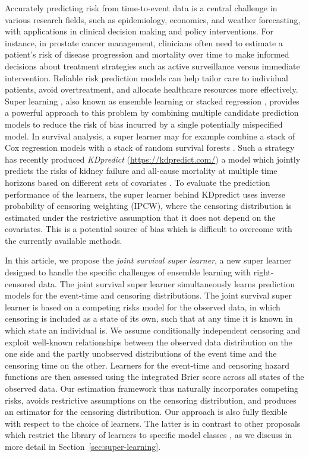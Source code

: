 \documentclass[alpha-refs]{wiley-article}
\newcommand{\1}{\mathds{1}}
\begin{document}
Accurately predicting risk from time-to-event data is a central
challenge in various research fields, such as epidemiology, economics,
and weather forecasting, with applications in clinical decision making
and policy interventions. For instance, in prostate cancer management,
clinicians often need to estimate a patient’s risk of disease
progression and mortality over time to make informed decisions about
treatment strategies such as active surveillance versus immediate
intervention. Reliable risk prediction models can help tailor care to
individual patients, avoid overtreatment, and allocate healthcare
resources more effectively. Super learning \citep{van2007super}, also
known as ensemble learning or stacked regression
\citep{wolpert1992stacked,breiman1996stacked}, provides a powerful
approach to this problem by combining multiple candidate prediction
models to reduce the risk of bias incurred by a single potentially
mispecified model. In survival analysis, a super learner may for example combine a
stack of Cox regression models with a stack of random survival forests
\citep[][Section 8.4]{gerds2021medical}. Such a strategy has recently
produced \textit{KDpredict} (\url{https://kdpredict.com/}) a model which
jointly predicts the risks of kidney failure and all-cause mortality
at multiple time horizons based on different sets of covariates
\citep{liu2024predicting}. To evaluate the prediction performance of
the learners, the super learner behind KDpredict uses inverse
probability of censoring weighting (IPCW), where the censoring
distribution is estimated under the restrictive assumption that it
does not depend on the covariates. This is a potential source of bias
which is difficult to overcome with the currently available methods.

In this article, we propose the {\it joint survival super learner}, a
new super learner designed to handle the specific challenges of
ensemble learning with right-censored data. The joint survival super
learner simultaneously learns prediction models for the event-time and
censoring distributions. The joint survival super learner is based on
a competing risks model for the observed data, in which censoring is
included as a state of its own, such that at any time it is known in
which state an individual is. We assume conditionally independent
censoring and exploit well-known relationships between the observed
data distribution on the one side and the partly unobserved
distributions of the event time and the censoring time on the
other. Learners for the event-time and censoring hazard functions are
then assessed using the integrated Brier score across all states of
the observed data. Our estimation framework thus naturally
incorporates competing risks, avoids restrictive assumptions on the
censoring distribution, and produces an estimator for the censoring
distribution. Our approach is also fully flexible with respect to the
choice of learners. The latter is in contrast to other proposals which
restrict the library of learners to specific model classes
\citep{polley2011-sl-cens,golmakani2020super}, as we discuss in more
detail in Section~\ref{sec:super-learning}.
\end{document}
